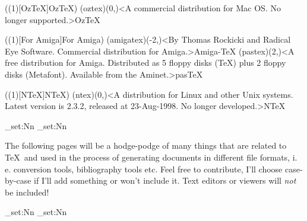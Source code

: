 \tograph(\tostruct(1)[OzTeX]{OzTeX}){
	\tonode[\histdistro](oztex)(0,\layer)<A commercial distribution for Mac OS. No longer supported.>{Oz\TeX}
}

\tograph(\tostruct(1)[For Amiga]{For Amiga}){
	\tonode[\histdistro](amigatex)(-2,\layer)<By Thomas Rockicki and Radical Eye Software. Commercial distribution for Amiga.>{Amiga-TeX}
	\tonode[\histdistro](pastex)(2,\layer)<A free distribution for Amiga. Distributed as 5 floppy disks (TeX) plus 2 floppy disks (Metafont). Available from the Aminet.>{pasTeX}
}

\tograph(\tostruct(1)[N\TeX]{N\TeX}){
	\tonode[\histdistro](ntex)(0,\layer)<A distribution for Linux and other Unix systems. Latest version is 2.3.2, released at 23-Aug-1998. No longer developed.>{N\TeX}
}

\newpage
\ExplSyntaxOn
  \dim_set:Nn\pdfpagewidth{13cm}       %
  \dim_set:Nn\pdfpageheight{6cm}
\ExplSyntaxOff
\newpage
{}
\parbox{\textwidth}{\normalsize
The following pages will be a hodge-podge of many things that are related to \TeX\ and used in the process of generating documents in different file formats, i.\,e. conversion tools, bibliography tools etc. Feel free to contribute, I'll choose case-by-case if I'll add something or won't include it. Text editors or viewers will \emph{not} be included!
}
  \restoregeometry
\ExplSyntaxOn
  \dim_set:Nn\pdfpagewidth{21cm}     %
  \dim_set:Nn\pdfpageheight{29.7cm}
\ExplSyntaxOff

